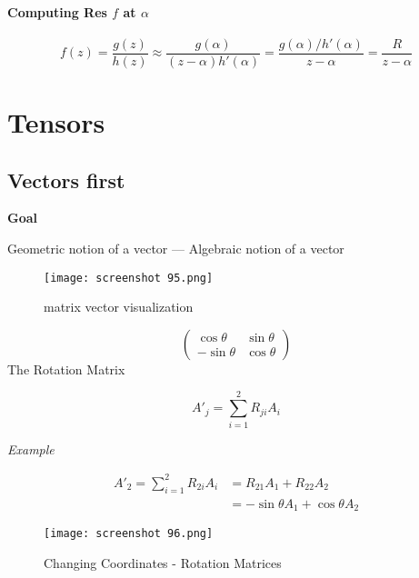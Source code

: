 \documentclass[svgnames]{article}   	%
\begin{document}
\paragraph{Computing Res $f$ at $\alpha$} 

 \[
f(z) = \frac{g(z)}{h(z)} \approx \frac{g(\alpha)}{(z-\alpha)h'(\alpha)}
= \frac{g(\alpha) / h'(\alpha)}{z - \alpha} = \frac{R}{z - \alpha}
\]
\section{Tensors} 

\subsection{Vectors first} 

\textbf{Goal} 

Geometric notion of a vector --- Algebraic notion of a vector

\begin{figure}[H]
  \centering
    \texttt{[image: screenshot 95.png]}
    \caption{matrix vector visualization}
\end{figure}


\vspace{5px}
\[
\begin{pmatrix} 
\cos\theta & \sin\theta \\
-\sin\theta & \cos\theta 
\end{pmatrix}
\]
The Rotation Matrix
\vspace{10px} 
\begin{tcolorbox}	
  
  \[
    A'_j = \sum_{i=1}^{2} R_{ji} A_i
  \]
  
  

\end{tcolorbox}	

\textit{Example}

\begin{align*}
  A'_2 = \sum_{i=1}^{2} R_{2i} A_i &= R_{21} A_1 + R_{22} A_2 \\
                                   & = -\sin\theta A_1 + \cos\theta A_2
\end{align*}

\begin{figure}[H]
  \centering
    \texttt{[image: screenshot 96.png]}
    \caption{Changing Coordinates - Rotation Matrices}
\end{figure}
\end{document}
